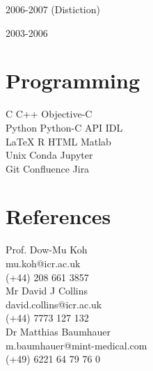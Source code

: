 \documentclass[]{mbcv}
\begin{document}
{\begin{minipage}[t][0.85\textheight]{0.3\textwidth}
2006-2007 (Distiction)
\sectionsep

2003-2006
\sectionsep


\section{Programming}
\vspace{5pt}
 C \textbullet{}  C++ \textbullet{} Objective-C  \\
Python \textbullet{} Python-C API \textbullet{} IDL  \\
 \LaTeX \textbullet{} R \textbullet{} HTML \textbullet{} Matlab\\
\vspace{5pt}
Unix \textbullet{} Conda \textbullet{} Jupyter  \\
Git \textbullet{} Confluence \textbullet{} Jira \\
\sectionsep

\section{References}
\vspace{5pt}
\Gentsroom\hspace*{5pt} Prof. Dow-Mu Koh \\
\Letter\hspace*{3pt} mu.koh@icr.ac.uk \\
\Telefon\hspace*{3pt} (+44) 208 661 3857 \\
\vspace*{10pt}
\Gentsroom\hspace*{5pt} Mr David J Collins \\
\Letter\hspace*{3pt} david.collins@icr.ac.uk \\
\Telefon\hspace*{3pt} (+44) 7773 127 132 \\
\vspace*{10pt}
\Gentsroom\hspace*{5pt} Dr Matthias Baumhauer \\
\Letter\hspace*{3pt} m.baumhauer@mint-medical.com \\
\Telefon\hspace*{3pt}  (+49) 6221 64 79 76 0 \\

\end{minipage}}%
\end{document}
